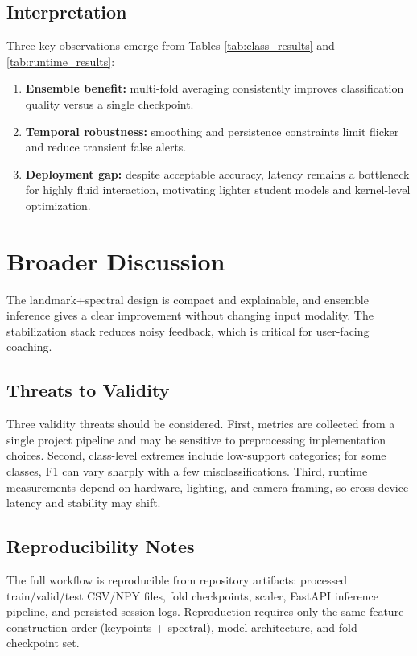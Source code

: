 \documentclass[conference]{IEEEtran}
\begin{document}
\subsection{Interpretation}
Three key observations emerge from Tables \ref{tab:class_results} and \ref{tab:runtime_results}:
\begin{enumerate}
\item \textbf{Ensemble benefit:} multi-fold averaging consistently improves classification quality versus a single checkpoint.
\item \textbf{Temporal robustness:} smoothing and persistence constraints limit flicker and reduce transient false alerts.
\item \textbf{Deployment gap:} despite acceptable accuracy, latency remains a bottleneck for highly fluid interaction, motivating lighter student models and kernel-level optimization.
\end{enumerate}

\section{Broader Discussion}
The landmark+spectral design is compact and explainable, and ensemble inference gives a clear improvement without changing input modality. The stabilization stack reduces noisy feedback, which is critical for user-facing coaching.

\subsection{Threats to Validity}
Three validity threats should be considered. First, metrics are collected from a single project pipeline and may be sensitive to preprocessing implementation choices. Second, class-level extremes include low-support categories; for some classes, F1 can vary sharply with a few misclassifications. Third, runtime measurements depend on hardware, lighting, and camera framing, so cross-device latency and stability may shift.

\subsection{Reproducibility Notes}
The full workflow is reproducible from repository artifacts: processed train/valid/test CSV/NPY files, fold checkpoints, scaler, FastAPI inference pipeline, and persisted session logs. Reproduction requires only the same feature construction order (keypoints + spectral), model architecture, and fold checkpoint set.
\end{document}

